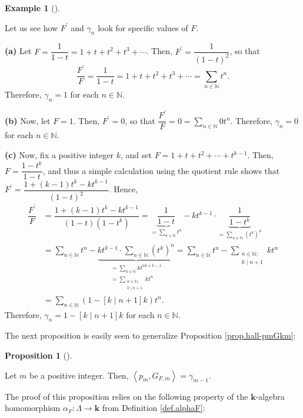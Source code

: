 \documentclass[numbers=enddot,12pt,final,onecolumn,notitlepage]{scrartcl}%
\theoremstyle{definition}
\newtheorem{prop}[theo]{Proposition}
\newenvironment{proposition}[1][]
{\begin{prop}[#1]\begin{leftbar}}
{\end{leftbar}\end{prop}}
\newtheorem{exam}[theo]{Example}
\newenvironment{example}[1][]
{\begin{exam}[#1]\begin{leftbar}}
{\end{leftbar}\end{exam}}
\let\sumnonlimits\sum
\renewcommand{\sum}{\sumnonlimits\limits}
\begin{document}
\begin{example}
Let us see how $F^{\prime}$ and $\gamma_{n}$ look for specific values of $F$.

\textbf{(a)} Let $F=\dfrac{1}{1-t}=1+t+t^{2}+t^{3}+\cdots$. Then, $F^{\prime
}=\dfrac{1}{\left(  1-t\right)  ^{2}}$, so that
\[
\dfrac{F^{\prime}}{F}=\dfrac{1}{1-t}=1+t+t^{2}+t^{3}+\cdots=\sum
_{n\in\mathbb{N}}t^{n}.
\]
Therefore, $\gamma_{n}=1$ for each $n\in\mathbb{N}$.

\textbf{(b)} Now, let $F=1$. Then, $F^{\prime}=0$, so that $\dfrac{F^{\prime}%
}{F}=0=\sum_{n\in\mathbb{N}}0t^{n}$. Therefore, $\gamma_{n}=0$ for each
$n\in\mathbb{N}$.

\textbf{(c)} Now, fix a positive integer $k$, and set $F=1+t+t^{2}%
+\cdots+t^{k-1}$. Then, $F=\dfrac{1-t^{k}}{1-t}$, and thus a simple
calculation using the quotient rule shows that $F^{\prime}=\dfrac{1+\left(
k-1\right)  t^{k}-kt^{k-1}}{\left(  1-t\right)  ^{2}}$. Hence,
\begin{align*}
\dfrac{F^{\prime}}{F}  &  =\dfrac{1+\left(  k-1\right)  t^{k}-kt^{k-1}%
}{\left(  1-t\right)  \left(  1-t^{k}\right)  }=\underbrace{\dfrac{1}{1-t}%
}_{=\sum_{n\in\mathbb{N}}t^{n}}-kt^{k-1}\cdot\underbrace{\dfrac{1}{1-t^{k}}%
}_{=\sum_{n\in\mathbb{N}}\left(  t^{k}\right)  ^{n}}\\
&  =\sum_{n\in\mathbb{N}}t^{n}-\underbrace{kt^{k-1}\cdot\sum_{n\in\mathbb{N}%
}\left(  t^{k}\right)  ^{n}}_{\substack{=\sum_{n\in\mathbb{N}}kt^{nk+k-1}%
\\=\sum_{\substack{n\in\mathbb{N};\\k\mid n+1}}kt^{n}}}=\sum_{n\in\mathbb{N}%
}t^{n}-\sum_{\substack{n\in\mathbb{N};\\k\mid n+1}}kt^{n}\\
&  =\sum_{n\in\mathbb{N}}\left(  1-\left[  k\mid n+1\right]  k\right)  t^{n}.
\end{align*}
Therefore, $\gamma_{n}=1-\left[  k\mid n+1\right]  k$ for each $n\in
\mathbb{N}$.
\end{example}

The next proposition is easily seen to generalize Proposition
\ref{prop.hall-pmGkm}:

\begin{proposition}
\label{prop.hall-pmGFm}Let $m$ be a positive integer. Then, $\left\langle
p_{m},G_{F,m}\right\rangle =\gamma_{m-1}$.
\end{proposition}

The proof of this proposition relies on the following property of the
$\mathbf{k}$-algebra homomorphism $\alpha_{F}:\Lambda\rightarrow\mathbf{k}$
from Definition \ref{def.alphaF}:
\end{document}

